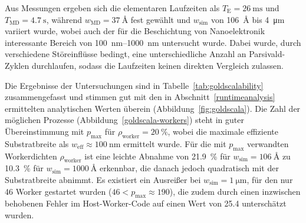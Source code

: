 Aus Messungen ergeben sich die elementaren Laufzeiten als $T_\text{E} = \SI{26}{\milli\second}$ und $T_\text{MD} = \SI{4.7}{\second}$, während $w_\text{MD} = \SI{37}{\angstrom}$ fest gewählt und $w_\text{sim}$ von \SI{106}{\angstrom} bis \SI{4}{\micro\meter} variiert wurde, wobei auch der für die Beschichtung von Nanoelektronik interessante Bereich von \SIrange{100}{1000}{\nano\meter} untersucht wurde.
Dabei wurde, durch verschiedene Störeinflüsse bedingt, eine unterschiedliche Anzahl an Parsivald-Zyklen durchlaufen, sodass die Laufzeiten keinen direkten Vergleich zulassen.

Die Ergebnisse der Untersuchungen sind in Tabelle~\ref{tab:goldscalability} zusammengefasst und stimmen gut mit den in Abschnitt~\ref{runtimeanalysis} ermittelten analytischen Werten überein (Abbildung~\ref{fig:goldscala}).
Die Zahl der möglichen Prozesse (Abbildung~\ref{goldscala-workers}) steht in guter Übereinstimmung mit $p_\text{max}$ für $\rho_\text{worker} = \SI{20}{\percent}$, wobei die maximale effiziente Substratbreite als $w_\text{eff} \approx \SI{100}{\nano\meter}$ ermittelt wurde.
Für die mit $p_\text{max}$ verwandten Workerdichten $\rho_\text{worker}$ ist eine leichte Abnahme von \SI{21.9}{\percent} für $w_\text{sim} = \SI{106}{\angstrom}$ zu \SI{10.3}{\percent} für $w_\text{sim} = \SI{1000}{\angstrom}$ erkennbar, die danach jedoch quadratisch mit der Substratbreite abnimmt.
Es existiert ein Ausreißer bei $w_\text{sim} = \SI{1}{\micro\meter}$, für den nur 46 Worker gestartet wurden ($\num{46} < p_\text{max} \approx \num{190}$), die zudem durch einen inzwischen behobenen Fehler im Host-Worker-Code auf einen Wert von \num{25.4} unterschätzt wurden.

